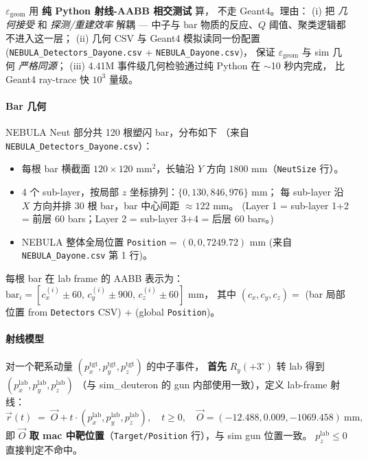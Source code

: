 \documentclass[a4paper,11pt]{ctexart}
\begin{document}
$\varepsilon_\mathrm{geom}$ 用 \textbf{纯 Python 射线-AABB 相交测试} 算，
不走 Geant4。理由：
(i) 把 \emph{几何接受} 和 \emph{探测/重建效率} 解耦 --- 中子与 bar 物质的反应、$Q$ 阈值、聚类逻辑都不进入这一层；
(ii) 几何 CSV 与 Geant4 模拟读同一份配置 (\texttt{NEBULA\_Detectors\_Dayone.csv} + \texttt{NEBULA\_Dayone.csv})，
保证 $\varepsilon_\mathrm{geom}$ 与 sim 几何 \emph{严格同源}；
(iii) 4.41M 事件级几何检验通过纯 Python 在 $\sim$10 秒内完成，
比 Geant4 ray-trace 快 $10^3$ 量级。

\paragraph{Bar 几何} NEBULA Neut 部分共 120 根塑闪 bar，分布如下
（来自 \texttt{NEBULA\_Detectors\_Dayone.csv}）：
\begin{itemize}
    \item 每根 bar 横截面 $120 \times 120$ mm$^2$，长轴沿 $Y$ 方向 $1800$ mm（\texttt{NeutSize} 行）。
    \item 4 个 sub-layer，按局部 $z$ 坐标排列：$\{0, 130, 846, 976\}$ mm；
          每 sub-layer 沿 $X$ 方向并排 30 根 bar，bar 中心间距 $\approx 122$ mm。
          (Layer 1 = sub-layer 1+2 = 前层 60 bars；Layer 2 = sub-layer 3+4 = 后层 60 bars。)
    \item NEBULA 整体全局位置 \texttt{Position} = $(0, 0, 7249.72)$ mm
          (来自 \texttt{NEBULA\_Dayone.csv} 第 1 行)。
\end{itemize}
每根 bar 在 lab frame 的 AABB 表示为：
$\mathrm{bar}_i = [c_x^{(i)} \pm 60, \, c_y^{(i)} \pm 900, \, c_z^{(i)} \pm 60]$ mm，
其中 $(c_x, c_y, c_z) =$ (bar 局部位置 from \texttt{Detectors} CSV) $+$ (global \texttt{Position})。

\paragraph{射线模型} 对一个靶系动量 $(p_x^\mathrm{tgt}, p_y^\mathrm{tgt}, p_z^\mathrm{tgt})$ 的中子事件，
\textbf{首先} $R_y(+3^\circ)$ 转 lab 得到 $(p_x^\mathrm{lab}, p_y^\mathrm{lab}, p_z^\mathrm{lab})$
（与 sim\_deuteron 的 gun 内部使用一致），定义 lab-frame 射线：
\[
\vec r(t) \;=\; \vec O + t \cdot (p_x^\mathrm{lab}, p_y^\mathrm{lab}, p_z^\mathrm{lab}),
\quad t \geq 0,
\quad \vec O = (-12.488, 0.009, -1069.458)\ \mathrm{mm},
\]
即 \textbf{$\vec O$ 取 mac 中靶位置}（\texttt{Target/Position} 行），与 sim gun 位置一致。
$p_z^\mathrm{lab} \leq 0$ 直接判定不命中。
\end{document}

